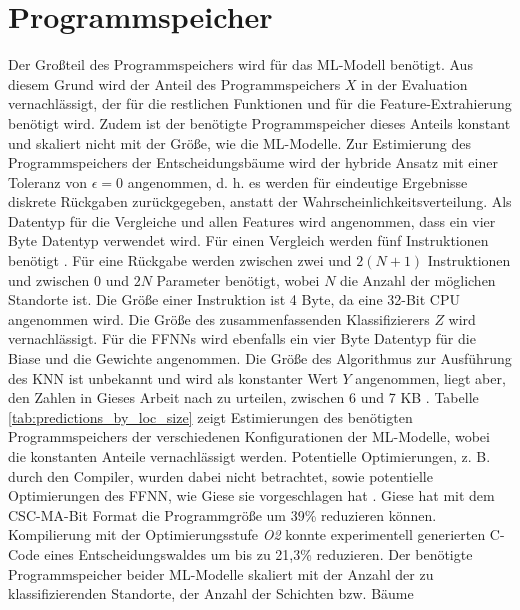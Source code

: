 \section{Programmspeicher}
Der Großteil des Programmspeichers wird für das ML-Modell benötigt.
Aus diesem Grund wird der Anteil des Programmspeichers $X$ in der Evaluation vernachlässigt,
der für die restlichen Funktionen und für die Feature-Extrahierung benötigt wird.
Zudem ist der benötigte Programmspeicher dieses Anteils konstant und skaliert nicht mit der Größe, wie die ML-Modelle.
\newline
\newline
Zur Estimierung des Programmspeichers der Entscheidungsbäume wird der hybride Ansatz mit einer Toleranz von $\epsilon=0$ angenommen,
d. h. es werden für eindeutige Ergebnisse diskrete Rückgaben zurückgegeben, anstatt der Wahrscheinlichkeitsverteilung.
Als Datentyp für die Vergleiche und allen Features wird angenommen, dass ein vier Byte Datentyp verwendet wird.
Für einen Vergleich werden fünf Instruktionen benötigt \cite{dymelThesis}.
Für eine Rückgabe werden zwischen zwei und $2(N+1)$ Instruktionen und zwischen 0 und $2N$ Parameter benötigt,
wobei $N$ die Anzahl der möglichen Standorte ist.
Die Größe einer Instruktion ist 4 Byte, da eine 32-Bit CPU angenommen wird.
Die Größe des zusammenfassenden Klassifizierers $Z$ wird vernachlässigt.
\newline
\newline
Für die FFNNs wird ebenfalls ein vier Byte Datentyp für die Biase und die Gewichte angenommen.
Die Größe des Algorithmus zur Ausführung des KNN ist unbekannt und wird als konstanter Wert $Y$ angenommen,
liegt aber, den Zahlen in Gieses Arbeit nach zu urteilen, zwischen 6 und 7 KB \cite{gieseThesis}.
\newline
\newline
Tabelle \ref{tab:predictions_by_loc_size} zeigt Estimierungen des benötigten Programmspeichers der verschiedenen Konfigurationen der ML-Modelle,
wobei die konstanten Anteile vernachlässigt werden.
Potentielle Optimierungen, z. B. durch den Compiler, wurden dabei nicht betrachtet,
sowie potentielle Optimierungen des FFNN, wie Giese sie vorgeschlagen hat \cite{gieseThesis}.
Giese hat mit dem CSC-MA-Bit Format die Programmgröße um 39\% reduzieren können.
Kompilierung mit der Optimierungsstufe \textit{O2} konnte experimentell generierten C-Code
eines Entscheidungswaldes um bis zu 21,3\% reduzieren.
\newline
\newline
Der benötigte Programmspeicher beider ML-Modelle skaliert mit der Anzahl der zu klassifizierenden Standorte, der Anzahl der Schichten bzw. Bäume
